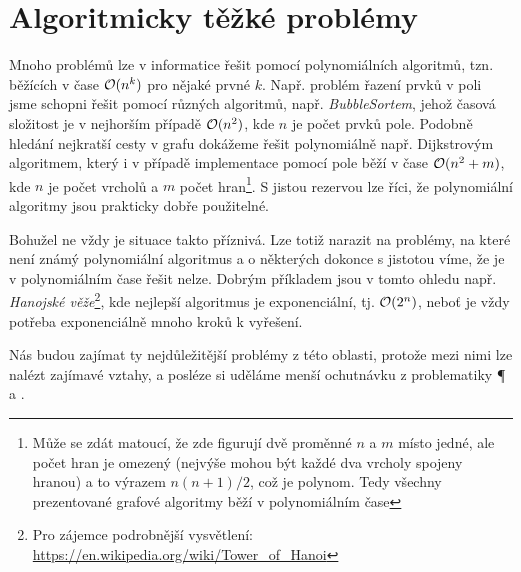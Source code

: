 \chapter{Algoritmicky těžké problémy}\label{chap:tezke-problemy}

Mnoho problémů lze v informatice řešit pomocí polynomiálních algoritmů, tzn. běžících v čase $\mathcal{O}(n^k)$ pro nějaké prvné $k$. Např. problém řazení prvků v poli jsme schopni řešit pomocí různých algoritmů, např. \emph{BubbleSortem}, jehož časová složitost je v nejhorším případě $\mathcal{O}(n^2)$, kde $n$ je počet prvků pole. Podobně hledání nejkratší cesty v grafu dokážeme řešit polynomiálně např. Dijkstrovým algoritmem, který i v případě implementace pomocí pole běží v čase $\mathcal{O}(n^2+m)$, kde $n$ je počet vrcholů a $m$ počet hran\footnote{Může se zdát matoucí, že zde figurují dvě proměnné $n$ a $m$ místo jedné, ale počet hran je omezený (nejvýše mohou být každé dva vrcholy spojeny hranou) a to výrazem $n(n+1)/2$, což je polynom. Tedy všechny prezentované grafové algoritmy běží v polynomiálním čase}. S jistou rezervou lze říci, že polynomiální algoritmy jsou prakticky dobře použitelné.

Bohužel ne vždy je situace takto příznivá. Lze totiž narazit na problémy, na které není známý polynomiální algoritmus a o některých dokonce s jistotou víme, že je v polynomiálním čase řešit nelze. Dobrým příkladem jsou v tomto ohledu např. \emph{Hanojské věže}\footnote{Pro zájemce podrobnější vysvětlení: \url{https://en.wikipedia.org/wiki/Tower_of_Hanoi}}, kde nejlepší algoritmus je exponenciální, tj. $\mathcal{O}(2^n)$, neboť je vždy potřeba exponenciálně mnoho kroků k vyřešení.

Nás budou zajímat ty nejdůležitější problémy z této oblasti, protože mezi nimi lze nalézt zajímavé vztahy, a posléze si uděláme menší ochutnávku z problematiky \P{} a \NP.


